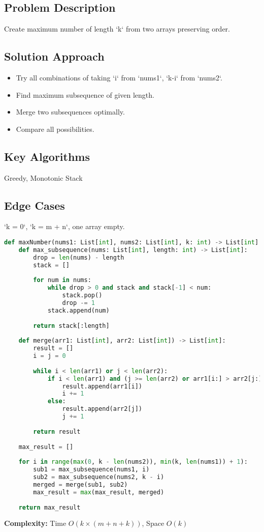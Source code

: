 \documentclass[10pt, a4paper]{article}
\begin{document}
\subsection*{Problem Description}
Create maximum number of length `k` from two arrays preserving order.

\subsection*{Solution Approach}
\begin{itemize}
    \item Try all combinations of taking `i` from `nums1`, `k-i` from `nums2`.
    \item Find maximum subsequence of given length.
    \item Merge two subsequences optimally.
    \item Compare all possibilities.
\end{itemize}

\subsection*{Key Algorithms}
Greedy, Monotonic Stack

\subsection*{Edge Cases}
`k = 0`, `k = m + n`, one array empty.

\begin{lstlisting}[language=Python]
def maxNumber(nums1: List[int], nums2: List[int], k: int) -> List[int]:
    def max_subsequence(nums: List[int], length: int) -> List[int]:
        drop = len(nums) - length
        stack = []
        
        for num in nums:
            while drop > 0 and stack and stack[-1] < num:
                stack.pop()
                drop -= 1
            stack.append(num)
        
        return stack[:length]
    
    def merge(arr1: List[int], arr2: List[int]) -> List[int]:
        result = []
        i = j = 0
        
        while i < len(arr1) or j < len(arr2):
            if i < len(arr1) and (j >= len(arr2) or arr1[i:] > arr2[j:]):
                result.append(arr1[i])
                i += 1
            else:
                result.append(arr2[j])
                j += 1
        
        return result
    
    max_result = []
    
    for i in range(max(0, k - len(nums2)), min(k, len(nums1)) + 1):
        sub1 = max_subsequence(nums1, i)
        sub2 = max_subsequence(nums2, k - i)
        merged = merge(sub1, sub2)
        max_result = max(max_result, merged)
    
    return max_result
\end{lstlisting}
\textbf{Complexity:} Time $O(k \times (m + n + k))$, Space $O(k)$
\end{document}
